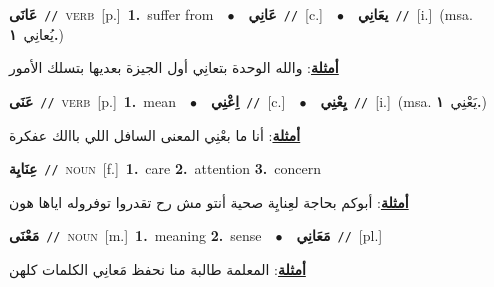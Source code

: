 \documentclass[10pt,a4paper,twoside]{article} %
\begin{document}
\begin{multicols}{2}
{\setlength\topsep{0pt}\textbf{\foreignlanguage{arabic}{عَانَى}}\ {\color{gray}\texttt{//}\color{black}}\ \textsc{verb}\ [p.]\ \textbf{1.}~suffer from\ \ $\bullet$\ \ \setlength\topsep{0pt}\textbf{\foreignlanguage{arabic}{عَانِي}}\ {\color{gray}\texttt{//}\color{black}}\ [c.]\ \ $\bullet$\ \ \setlength\topsep{0pt}\textbf{\foreignlanguage{arabic}{يعَانِي}}\ {\color{gray}\texttt{//}\color{black}}\ [i.]\ \color{gray}(msa. \foreignlanguage{arabic}{يُعانِي}~\foreignlanguage{arabic}{\textbf{١.}})\color{black}\  \begin{flushright}\color{gray}\foreignlanguage{arabic}{\textbf{\underline{\foreignlanguage{arabic}{أمثلة}}}: والله الوحدة بتعانِي أول الجيزة بعديها بتسلك الأمور}\end{flushright}\color{black}} \vspace{2mm}

{\setlength\topsep{0pt}\textbf{\foreignlanguage{arabic}{عَنَى}}\ {\color{gray}\texttt{//}\color{black}}\ \textsc{verb}\ [p.]\ \textbf{1.}~mean\ \ $\bullet$\ \ \setlength\topsep{0pt}\textbf{\foreignlanguage{arabic}{اِعْنِي}}\ {\color{gray}\texttt{//}\color{black}}\ [c.]\ \ $\bullet$\ \ \setlength\topsep{0pt}\textbf{\foreignlanguage{arabic}{يِعْنِي}}\ {\color{gray}\texttt{//}\color{black}}\ [i.]\ \color{gray}(msa. \foreignlanguage{arabic}{يَعْنِي}~\foreignlanguage{arabic}{\textbf{١.}})\color{black}\  \begin{flushright}\color{gray}\foreignlanguage{arabic}{\textbf{\underline{\foreignlanguage{arabic}{أمثلة}}}: أنا ما بعْنِي المعنى السافل اللي باالك عفكرة}\end{flushright}\color{black}} \vspace{2mm}

{\setlength\topsep{0pt}\textbf{\foreignlanguage{arabic}{عِنَايِة}}\ {\color{gray}\texttt{//}\color{black}}\ \textsc{noun}\ [f.]\ \textbf{1.}~care  \textbf{2.}~attention  \textbf{3.}~concern\  \begin{flushright}\color{gray}\foreignlanguage{arabic}{\textbf{\underline{\foreignlanguage{arabic}{أمثلة}}}: أبوكم بحاجة لعِنايِة صحية أنتو مش رح تقدروا توفروله اياها هون}\end{flushright}\color{black}} \vspace{2mm}

{\setlength\topsep{0pt}\textbf{\foreignlanguage{arabic}{مَعْنَى}}\ {\color{gray}\texttt{//}\color{black}}\ \textsc{noun}\ [m.]\ \textbf{1.}~meaning  \textbf{2.}~sense\ \ $\bullet$\ \ \setlength\topsep{0pt}\textbf{\foreignlanguage{arabic}{مَعَانِي}}\ {\color{gray}\texttt{//}\color{black}}\ [pl.]\  \begin{flushright}\color{gray}\foreignlanguage{arabic}{\textbf{\underline{\foreignlanguage{arabic}{أمثلة}}}: المعلمة طالبة منا نحفظ مَعانِي الكلمات كلهن}\end{flushright}\color{black}} \vspace{2mm}


\end{multicols}
\end{document}
